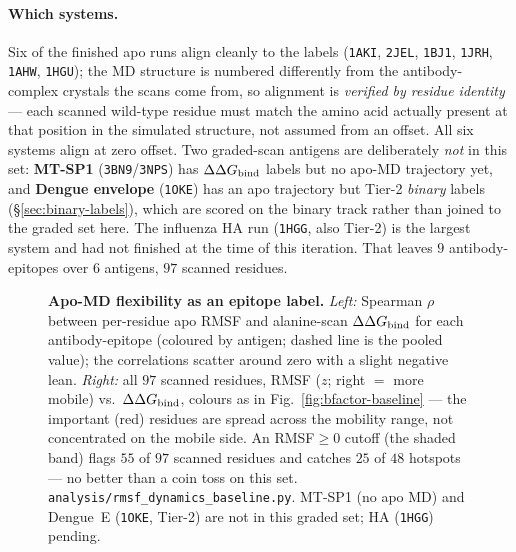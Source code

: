 \paragraph{Which systems.} Six of the finished apo runs align cleanly to the labels
(\texttt{1AKI}, \texttt{2JEL}, \texttt{1BJ1}, \texttt{1JRH}, \texttt{1AHW}, \texttt{1HGU}); the MD
structure is numbered differently from the antibody-complex crystals the scans come from, so alignment
is \emph{verified by residue identity} --- each scanned wild-type residue must match the amino acid
actually present at that position in the simulated structure, not assumed from an offset. All six
systems align at zero offset. Two graded-scan antigens are deliberately \emph{not} in this set:
\textbf{MT-SP1} (\texttt{3BN9}/\texttt{3NPS}) has $\Delta\Delta G_{\mathrm{bind}}$ labels but no apo-MD trajectory yet, and
\textbf{Dengue envelope} (\texttt{1OKE}) has an apo trajectory but Tier-2 \emph{binary} labels
(\S\ref{sec:binary-labels}), which are scored on the binary track rather than joined to the graded
set here. The influenza HA run (\texttt{1HGG}, also Tier-2) is the largest system and had not
finished at the time of this iteration. That leaves $9$ antibody-epitopes over $6$ antigens,
$97$ scanned residues.

\begin{figure}[H]\centering
{}
\caption{\textbf{Apo-MD flexibility as an epitope label.} \emph{Left:} Spearman $\rho$ between
per-residue apo RMSF and alanine-scan $\Delta\Delta G_{\mathrm{bind}}$ for each antibody-epitope (coloured by antigen; dashed
line is the pooled value); the correlations scatter around zero with a slight negative lean.
\emph{Right:} all $97$ scanned residues, RMSF ($z$; right $=$ more mobile) vs.\ $\Delta\Delta G_{\mathrm{bind}}$, colours as in
Fig.~\ref{fig:bfactor-baseline} --- the important (red) residues are spread across the mobility range,
not concentrated on the mobile side. An RMSF$\geq 0$ cutoff (the shaded band) flags $55$ of $97$ scanned
residues and catches $25$ of $48$ hotspots --- no better than a coin toss on this set.
\texttt{analysis/rmsf\_dynamics\_baseline.py}. MT-SP1 (no apo MD) and Dengue~E (\texttt{1OKE}, Tier-2)
are not in this graded set; HA (\texttt{1HGG}) pending.}\label{fig:rmsf-baseline}
\end{figure}

